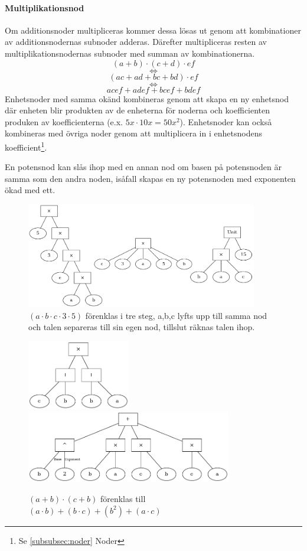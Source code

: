 \documentclass[12pt,a4paper]{article}
\begin{document}
\paragraph{Multiplikationsnod}
Om additionsnoder multipliceras kommer dessa lösas ut genom att kombinationer av additionsnodernas subnoder adderas. Därefter multipliceras resten av multiplikationsnodernas subnoder med summan av kombinationerna.
\[ \left( a+b \right) \cdot \left( c+d \right) \cdot ef \]
\[ \Leftrightarrow \]
\[ (ac + ad + bc + bd)\cdot ef \]
\[ \Leftrightarrow \]
\[ acef + adef + bcef + bdef \]
Enhetsnoder med samma okänd kombineras genom att skapa en ny enhetsnod där enheten blir produkten av de enheterna för noderna och koefficienten produken av koefficienterna (e.x. \(5x \cdot 10x = 50x^{2}\)). Enhetsnoder kan också kombineras med övriga noder genom att multiplicera in i enhetsnodens koefficient\footnote{Se \ref{subsubsec:noder} Noder}.\par
En potensnod kan slås ihop med en annan nod om basen på potensnoden är samma som den andra noden, isåfall skapas en ny potensnoden med exponenten ökad med ett.
\begin{figure}[H]
  \centering
  \includegraphics[width=0.9\textwidth]{image-merged}
  \caption{\((a \cdot b \cdot c \cdot 3 \cdot 5)\) förenklas i tre steg, a,b,c lyfts upp till samma nod och talen separeras till sin egen nod, tillslut räknas talen ihop.}
  \label{fig:2313}
\end{figure}
\begin{figure}[H]
  \centering
  \includegraphics[width=0.4\textwidth]{image26}
  \includegraphics[width=0.8\textwidth]{image32}
  \caption{\((a + b) \cdot (c + b)\) förenklas till \((a \cdot b) + (b \cdot c) + (b ^ 2) + (a \cdot c)\)}
\end{figure}
\end{document}
